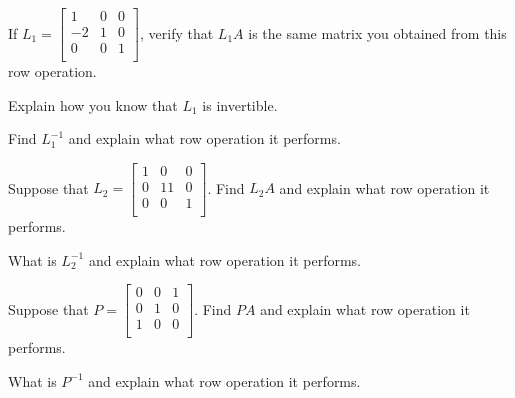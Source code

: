\documentclass[12pt]{article}
\newcommand{\vs}[1]{\vspace{#1in}}
\begin{document}
\begin{enumerate}
  \vs{1}
  If
  $L_1 =
  \left[
    \begin{array}{ccc}
      1 & 0 & 0 \\
      -2 & 1 & 0 \\
      0 & 0 & 1 \\
    \end{array}
  \right]
  $, verify that $L_1A$ is the same matrix you obtained from this row
  operation.

  \vs{1}
  Explain how you know that  $L_1$ is invertible.

  \vs{1}
  \newpage
  Find $L_1^{-1}$ and explain what row operation it performs.  

  \vs{1}
  Suppose that
  $L_2 =
  \left[
    \begin{array}{ccc}
      1 & 0 & 0 \\
      0 & 11 & 0 \\
      0 & 0 & 1 \\
    \end{array}
  \right]
  $.  Find $L_2A$ and explain what row operation it performs.

  \vs{1}
  What is $L_2^{-1}$ and explain what row operation it performs.

  \vs{1}
  Suppose that
  $
  P =
  \left[
    \begin{array}{ccc}
      0 & 0 & 1 \\
      0 & 1 & 0 \\
      1 & 0 & 0 \\
    \end{array}
  \right]
  $.  Find $PA$ and explain what row operation it performs.
  
  \vs{1}
  What is $P^{-1}$ and explain what row operation it performs.
  
  
  
              
    
    


\end{enumerate}
\end{document}
